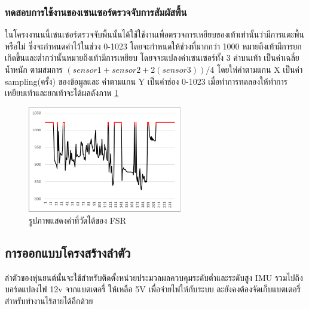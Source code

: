\subsubsection{ทดสอบการใช้งานของเซนเซอร์ตรวจจับการสัมผัสพื้น}
ในโครงงานนนี้เซนเซอร์ตรวจจับพื้นนั้นได้ใช้ใช้งานเพื่อตรวจการเหยียบของเท้าเท่านั้นว่ามีการแตะพื้นหรือไม่ ซึ่งจะกำหนดค่าไว้ในช่วง 
0-1023 โดยจะกำหนดให้ช่วงที่มากกว่า 1000 หมายถึงเท้ามีการยกเกิดขึ้นและต่ำกว่านั้นหมายถึงเท้ามีการเหยียบ โดยจจะแปลงค่าเซนเซอร์ทั้ง 3 ค่าบนเท้า
เป็นค่าเฉลี่ยน้ำหนัก ตามสมการ $(sensor1 + sensor 2 + 2(sensor3))/4$ โดยให่ค่าตามแกน X เป็นค่า sampling(ครั้ง) ของข้อมูลและ
ค่าตามแกน Y เป็นค่าช่อง 0-1023 เมื่อทำการทดลองให้ทำการเหยียบเท้าและยกเท้าจะได้ผลดังภาพ \ref{fig:FSR_graph}

\begin{figure}[!ht]
  \centering
  \includegraphics[width=0.6\textwidth]{chapter4/images/FSR_graph.PNG}
  \caption{รูปภาพแสดงค่าที่วัดได้ของ FSR}
  \label{fig:FSR_graph}
\end{figure}

\clearpage
\subsection{การออกแบบโครงสร้างลำตัว}
ลำตัวของหุ่นยนต์นั้นจะใช้สำหรับติดตั้งหน่วยประมวลผลควบคุมระดับต่ำและระดับสูง IMU รวมไปถึงบอร์ดแปลงไฟ 12v จากแบตเตอรี่
ให้เหลือ 5V เพื่อจ่ายไฟให้กับระบบ ละยังคงต้องจัดเก็บแบตเตอรี่สำหรับทำงานไร้สายได้อีกด้วย 
